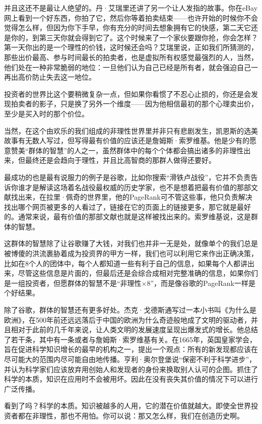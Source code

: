 并且这还不是最让人绝望的。丹·艾瑞里还讲了另一个让人发指的故事。你在eBay网上看到一个好东西，你拍了它，然后你等着拍卖结束------也许开始的时候你不会觉得怎么样，但因为你下手早，你有充分的时间去想象拥有它的快感，第二天它还是你的，到第三天你就会得到它了。这个时候来了一个家伙要跟你抢，你会怎样？第一天你出的是一个理性的价钱，这时候还会吗？艾瑞里说，正如我们所猜测的，那些出价最高、参与时间最长的拍卖者，也是虚拟所有权感觉最强烈的人，当然，他们处在一种非常脆弱的地位：一旦他们认为自己已经是所有者，就会强迫自己一再出高价防止失去这一地位。

投资者的世界比这个要稍微复杂一点，但如果你看惯了不忍心止损的，你还是会发现拍卖者的影子，只是换了另外一个维度------因为他相信最初的那个心理卖出价，至少是买入时的那个价位。

当然，在这个由欢乐的我们组成的非理性世界里并非只有悲剧发生，凯恩斯的选美故事有无数人写过，但写得最有价值的应该还是詹姆斯·索罗维基。他是少有的愿意赞美``群体的智慧''的人之一，虽然群体中的每个个体都会搞出诸多的非理性出来，但最终还是会趋向于理性，并且比高智商的那群人做得还要好。

最成功的也是最有说服力的例子是谷歌，比如你搜索``滑铁卢战役''，它并不负责告诉你谁才是解读这场着名战役最权威的历史学家，也不是想着把最有价值的那部文献找出来，在拉里·佩奇的世界里，他的PageRank可不管这些事，他只负责解决找出哪个网页被更多的人看过了，链接在它的页面上的链接更多，那它就是最好的。通常来说，最有价值的那部文献也就是这样被找出来的。索罗维基说，这是群体的智慧。

这群体的智慧除了让谷歌赚了大钱，对我们也并非一无是处，就像单个的我们总是被博傻的洪流裹胁着成为投资界的甲方一样，我们也可以利用它来作出正确决策，比如在8个人的团体中，每个人都知道一些有利于自己的信息，如果每个人都讲出来，尽管这些信息是片面的，但最后还是会综合成相对完整准确的信息，如果你们是一组投资者，但愿群体的智慧不是``非理性×8''，而是像谷歌的PageRank一样是个好结果。

除了谷歌，群体的智慧还有更多好处。杰克·戈德斯通写过一本小书叫《为什么是欧洲》，在500年前还远远落后于中国的欧洲为什么奇迹般地成了文明的驱动者，并且相对于此前的几千年来说，让人类文明的发展速度呈现出爆发式的增长。他总结了若干条，其中有一条或者与詹姆斯·索罗维基有关。在1665年，英国皇家学会，旨在促进科学知识增长的最早的机构之一，提出一个观点：所有的新发现都应该在尽可能大的范围内尽可能自由地传播。亨利·奥尔登堡说``保密不利于科学进步''，并认为科学家们应该放弃用创始人和发现者的身份来换取别人认可的企图。抓住了科学的本质，知识在应用时不会被用坏。因此在没有丧失其价值的情况下可以进行广泛传播。

看到了吗？科学的本质。知识被越多的人用，它的潜在价值就越大。即使全世界投资者都在非理性，那也不用怕。你可以说：那又怎么样，我们在创造历史啊。

